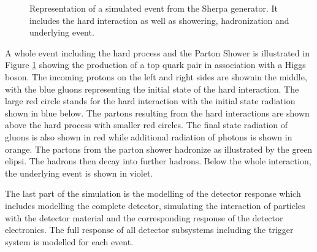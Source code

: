 \begin{figure}[htbp!]
  \begin{center}
\caption{Representation of a simulated event from the Sherpa generator. It includes the hard interaction as well as showering, hadronization and underlying event\cite{Gleisberg:2008ta}.
  \label{fig:sim_sherpa}}
  \end{center}
\end{figure}

A whole event including the hard process and the Parton Shower is illustrated in Figure \ref{fig:sim_sherpa} showing the production of a top quark pair in association with a Higgs boson.
The incoming protons on the left and right sides are shownin the middle, with the blue gluons representing the initial state of the hard interaction.
The large red circle stands for the hard interaction with the initial state radiation shown in blue below.
The partons resulting from the hard interactions are shown above the hard process with smaller red circles. The final state radiation of gluons is also shown in red while additional radiation of photons is shown in orange.
The partons from the parton shower hadronize as illustrated by the green elipsi. The hadrons then decay into further hadrons.
Below the whole interaction, the underlying event is shown in violet.

The last part of the simulation is the modelling of the detector response which includes modelling the complete detector, simulating the interaction of particles with the detector material and the corresponding
response of the detector electronics. The full response of all detector subsystems including the trigger system is modelled for each event.

